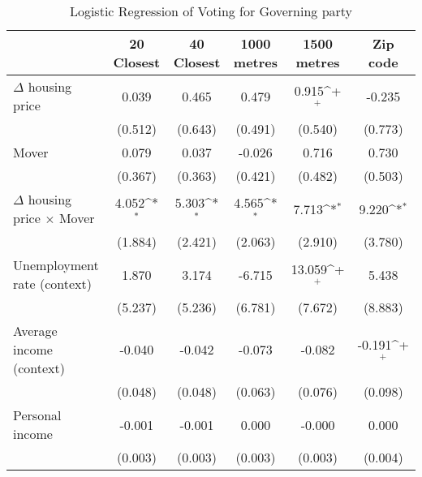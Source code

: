\begin{table}[htbp]\centering
\def\sym#1{\ifmmode^{#1}\else\(^{#1}\)\fi}
\caption{Logistic Regression of Voting for Governing party } \label{logitinter}
\begin{tabular}{l*{5}{c}}
\hline\hline
                    &\multicolumn{1}{c}{20 Closest}&\multicolumn{1}{c}{40 Closest}&\multicolumn{1}{c}{1000 metres}&\multicolumn{1}{c}{1500 metres}&\multicolumn{1}{c}{Zip code}\\
\hline
$\Delta$ housing price&       0.039       &       0.465       &       0.479       &       0.915\sym{+}&      -0.235       \\
                    &     (0.512)       &     (0.643)       &     (0.491)       &     (0.540)       &     (0.773)       \\
[1em]
Mover               &       0.079       &       0.037       &      -0.026       &       0.716       &       0.730       \\
                    &     (0.367)       &     (0.363)       &     (0.421)       &     (0.482)       &     (0.503)       \\
[1em]
$\Delta$ housing price $\times$ Mover&       4.052\sym{*}&       5.303\sym{*}&       4.565\sym{*}&       7.713\sym{*}&       9.220\sym{*}\\
                    &     (1.884)       &     (2.421)       &     (2.063)       &     (2.910)       &     (3.780)       \\
[1em]
Unemployment rate (context)&       1.870       &       3.174       &      -6.715       &      13.059\sym{+}&       5.438       \\
                    &     (5.237)       &     (5.236)       &     (6.781)       &     (7.672)       &     (8.883)       \\
[1em]
Average income (context)&      -0.040       &      -0.042       &      -0.073       &      -0.082       &      -0.191\sym{+}\\
                    &     (0.048)       &     (0.048)       &     (0.063)       &     (0.076)       &     (0.098)       \\
[1em]
Personal income     &      -0.001       &      -0.001       &       0.000       &      -0.000       &       0.000       \\
                    &     (0.003)       &     (0.003)       &     (0.003)       &     (0.003)       &     (0.004)       \\

\end{tabular}
\end{table}

